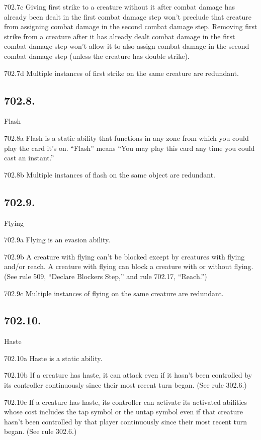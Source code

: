 702.7c Giving first strike to a creature without it after combat damage has already been dealt in the first combat damage step won’t preclude that creature from assigning combat damage in the second combat damage step. Removing first strike from a creature after it has already dealt combat damage in the first combat damage step won’t allow it to also assign combat damage in the second combat damage step (unless the creature has double strike).

702.7d Multiple instances of first strike on the same creature are redundant.

\subsection*{702.8.}
Flash

702.8a Flash is a static ability that functions in any zone from which you could play the card it’s on. “Flash” means “You may play this card any time you could cast an instant.”

702.8b Multiple instances of flash on the same object are redundant.

\subsection*{702.9.}
Flying

702.9a Flying is an evasion ability.

702.9b A creature with flying can’t be blocked except by creatures with flying and/or reach. A creature with flying can block a creature with or without flying. (See rule 509, “Declare Blockers Step,” and rule 702.17, “Reach.”)

702.9c Multiple instances of flying on the same creature are redundant.

\subsection*{702.10.}
Haste

702.10a Haste is a static ability.

702.10b If a creature has haste, it can attack even if it hasn’t been controlled by its controller continuously since their most recent turn began. (See rule 302.6.)

702.10c If a creature has haste, its controller can activate its activated abilities whose cost includes the tap symbol or the untap symbol even if that creature hasn’t been controlled by that player continuously since their most recent turn began. (See rule 302.6.)

